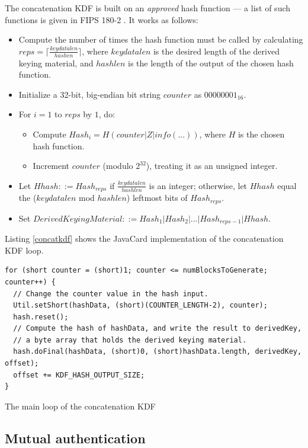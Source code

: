 \documentclass[12pt,a4paper,twoside,openright]{report}
\begin{document}
The concatenation KDF is built on an \emph{approved} hash function --- a list of such functions is given in FIPS 180-2 \cite{fips1802}. It works as follows:

\begin{itemize}
\item Compute the number of times the hash function must be called by calculating $reps = \lceil \frac{keydatalen}{hashen} \rceil$, where $keydatalen$ is the desired length of the derived keying material, and $hashlen$ is the length of the output of the chosen hash function.
\item Initialize a 32-bit, big-endian bit string $counter$ as $00000001_{16}$.
\item For $i = 1$ to $reps$ by $1$, do:
	\begin{itemize}
	\item Compute $Hash_i = H(counter \vert Z \vert info(...))$, where $H$ is the chosen hash function.
	\item Increment $counter$ (modulo $2^{32}$), treating it as an unsigned integer.
	\end{itemize}
\item Let $Hhash ::= Hash_{reps}$ if $\frac{keydatalen}{hashlen}$ is an integer; otherwise, let $Hhash$ equal the ($keydatalen$ mod $hashlen$) leftmost bits of $Hash_{reps}$.
\item Set $DerivedKeyingMaterial ::= Hash_1 \vert Hash_2 \vert ... \vert Hash_{reps-1} \vert Hhash$.
\end{itemize}

\noindent
Listing \autoref{concatkdf} shows the JavaCard implementation of the concatenation KDF loop.

\begin{listing}
\begin{verbatim}
for (short counter = (short)1; counter <= numBlocksToGenerate; counter++) {
  // Change the counter value in the hash input.
  Util.setShort(hashData, (short)(COUNTER_LENGTH-2), counter);
  hash.reset();
  // Compute the hash of hashData, and write the result to derivedKey,
  // a byte array that holds the derived keying material.
  hash.doFinal(hashData, (short)0, (short)hashData.length, derivedKey, offset);
  offset += KDF_HASH_OUTPUT_SIZE;
}
\end{verbatim}
\caption{The main loop of the concatenation KDF}
\label{concatkdf}
\end{listing}

\subsection{Mutual authentication}
\label{sec:mutualauth}
\end{document}
